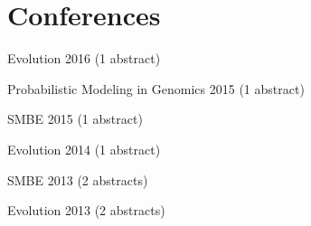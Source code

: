 \documentclass[letterpaper]{article}
\renewenvironment{itemize}{
  \begin{list}{}{
    \setlength{\leftmargin}{1.5em}
  }
}{
  \end{list}
}
\begin{document}


\section*{Conferences}
\begin{itemize}
\item Evolution 2016 (1 abstract)
 \item Probabilistic Modeling in Genomics 2015 (1 abstract)
 \item SMBE 2015 (1 abstract)
 \item Evolution 2014 (1 abstract)
 \item SMBE 2013 (2 abstracts)
 \item Evolution 2013 (2 abstracts)
\end{itemize}
\end{document}
